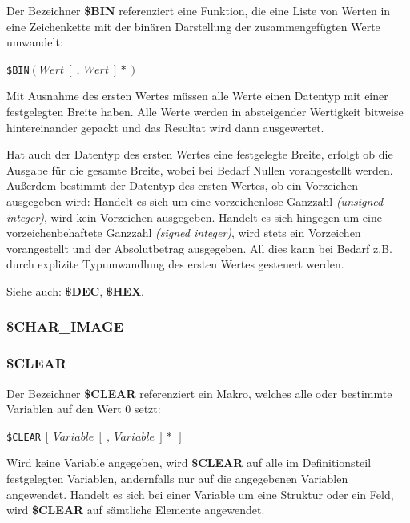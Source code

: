 \documentclass{scrartcl}
\begin{document}
\noindent Der Bezeichner \textbf{\$BIN} referenziert eine Funktion, die eine Liste von Werten in eine Zeichenkette mit der binären Darstellung der zusammengefügten Werte umwandelt:

\vspace{10pt}
\texttt{\$BIN$(Wert~[~,~Wert~]*)$}

\vspace{10pt}
\noindent Mit Ausnahme des ersten Wertes müssen alle Werte einen Datentyp mit einer festgelegten Breite haben. Alle Werte werden in absteigender Wertigkeit bitweise hintereinander gepackt und das Resultat wird dann ausgewertet.

\vspace{10pt}
\noindent Hat auch der Datentyp des ersten Wertes eine festgelegte Breite, erfolgt ob die Ausgabe für die gesamte Breite, wobei bei Bedarf Nullen vorangestellt werden. Außerdem bestimmt der Datentyp des ersten Wertes, ob ein Vorzeichen ausgegeben wird: Handelt es sich um eine vorzeichenlose Ganzzahl \textit{(unsigned integer)}, wird kein Vorzeichen ausgegeben. Handelt es sich hingegen um eine vorzeichenbehaftete Ganzzahl \textit{(signed integer)}, wird stets ein Vorzeichen vorangestellt und der Absolutbetrag ausgegeben. All dies kann bei Bedarf z.B. durch explizite Typumwandlung des ersten Wertes gesteuert werden.

\vspace{10pt}
\noindent Siehe auch: \textbf{\$DEC}, \textbf{\$HEX}.

\subsubsection{\$CHAR\_IMAGE}

\subsubsection{\$CLEAR}

\noindent Der Bezeichner \textbf{\$CLEAR} referenziert ein Makro, welches alle oder bestimmte Variablen auf den Wert 0 setzt:

\vspace{10pt}
\texttt{\$CLEAR$~[~Variable~[~,~Variable~]*~]$}

\vspace{10pt}
\noindent Wird keine Variable angegeben, wird \textbf{\$CLEAR} auf alle im Definitionsteil festgelegten Variablen, andernfalls nur auf die angegebenen Variablen angewendet. Handelt es sich bei einer Variable um eine Struktur oder ein Feld, wird \textbf{\$CLEAR} auf sämtliche Elemente angewendet.
\end{document}
